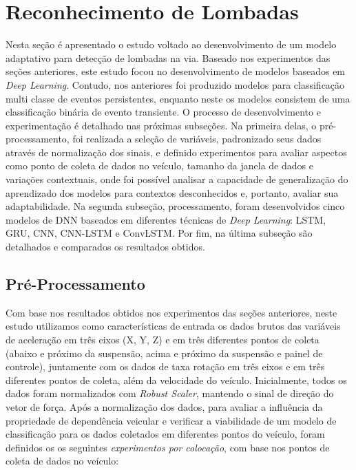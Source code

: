 \chapter{Reconhecimento de Lombadas}
\label{cap:deteccao_lombadas}

Nesta seção é apresentado o estudo voltado ao desenvolvimento de um modelo adaptativo para detecção de lombadas na via. Baseado nos experimentos das seções anteriores, este estudo focou no desenvolvimento de modelos baseados em \textit{Deep Learning}. Contudo, nos anteriores foi produzido modelos para classificação multi classe de eventos persistentes, enquanto neste os modelos consistem de uma classificação binária de evento transiente. O processo de desenvolvimento e experimentação é detalhado nas próximas subseções. Na primeira delas, o pré-processamento, foi realizada a seleção de variáveis, padronizado seus dados através de normalização dos sinais, e definido experimentos para avaliar aspectos como ponto de coleta de dados no veículo, tamanho da janela de dados e variações contextuais, onde foi possível analisar a capacidade de generalização do aprendizado dos modelos para contextos desconhecidos e, portanto, avaliar sua adaptabilidade. Na segunda subseção, processamento, foram desenvolvidos cinco modelos de DNN baseados em diferentes técnicas de \textit{Deep Learning}: LSTM, GRU, CNN, CNN-LSTM e ConvLSTM. Por fim, na última subseção são detalhados e comparados os resultados obtidos.

\section{Pré-Processamento}

Com base nos resultados obtidos nos experimentos das seções anteriores, neste estudo utilizamos como características de entrada os dados brutos das variáveis de aceleração em três eixos (X, Y, Z) e em três diferentes pontos de coleta (abaixo e próximo da suspensão, acima e próximo da suspensão e painel de controle), juntamente com os dados de taxa rotação em três eixos e em três diferentes pontos de coleta, além da velocidade do veículo. Inicialmente, todos os dados foram normalizados com \textit{Robust Scaler}, mantendo o sinal de direção do vetor de força. Após a normalização dos dados, para avaliar a influência da propriedade de dependência veicular e verificar a viabilidade de um modelo de classificação para os dados coletados em diferentes pontos do veículo, foram definidos os os seguintes \emph{experimentos por colocação}, com base nos pontos de coleta de dados no veículo:


